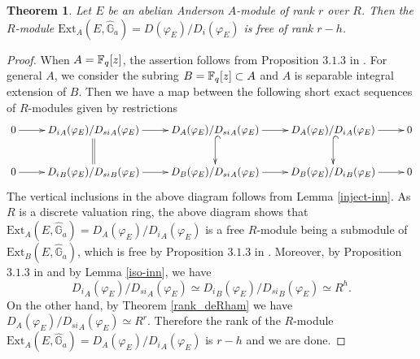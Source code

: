 \documentclass{amsart}
\newtheorem {theorem} {\bf{Theorem}}[section]
\numberwithin {equation}{section}
\begin{document}
\begin{theorem}\label{rank_Ext} Let $E$ be an abelian Anderson $A$-module of rank $r$ over $R$. Then the $R$-module $\mathrm{Ext}_{A}(E,\hat{\mathbb{G}}_{a})=D(\varphi_{E})/D_{i}(\varphi_{E})$ is free of rank $r-h$.
\end{theorem}
\begin{proof}When $A=\mathbb{F}_{q}[z]$, the assertion follows from Proposition $3.1.3$ in \cite{BrPa}. For general $A$, we consider the subring $B=\mathbb{F}_{q}[z]\subset A$ and $A$ is separable integral extension of $B$. Then we have a map between the following short exact sequences of $R$-modules given by restrictions
\begin{align*}
\xymatrix{
0  \ar[r] &{D_{i}}_{A}(\varphi_{E})/{D_{si}}_{A}(\varphi_{E}) \ar@{=}[d] \ar[r] &D_{A}(\varphi_{E})/{D_{si}}_{A}(\varphi_{E}) \ar@{^{(}->}[d] \ar[r] &D_{A}(\varphi_{E})/{D_{i}}_{A}(\varphi_{E}) \ar@{^{(}->}[d] \ar[r]&0 \\
0 \ar[r] &{D_{i}}_{B}(\varphi_{E})/{D_{si}}_{B}(\varphi_{E}) \ar[r] &D_{B}(\varphi_{E})/{D_{si}}_{A}(\varphi_{E}) \ar[r] & D_{B}(\varphi_{E})/{D_{i}}_{B}(\varphi_{E}) \ar[r] &0}
\end{align*}
The vertical inclusions in the above diagram follows from Lemma \ref{inject-inn}. As $R$ is a discrete valuation ring, the above diagram shows that $\mathrm{Ext}_{A}(E,\hat{\mathbb{G}}_{a})=D_{A}(\varphi_{E})/{D_{i}}_{A}(\varphi_{E})$ is a free $R$-module being a submodule of $\mathrm{Ext}_{B}(E,\hat{\mathbb{G}}_{a})$, which is free by Proposition $3.1.3$ in \cite{BrPa}.  
Moreover, by Proposition $3.1.3$ in \cite{BrPa} and by Lemma \ref{iso-inn}, we have $${D_{i}}_{A}(\varphi_{E})/{D_{si}}_{A}(\varphi_{E})\simeq {D_{i}}_{B}(\varphi_{E})/{D_{si}}_{B}(\varphi_{E})\simeq R^{h}.$$ On the other hand, by Theorem \ref{rank_deRham} we have $D_{A}(\varphi_{E})/{D_{si}}_{A}(\varphi_{E})\simeq R^{r}$. Therefore the rank of the $R$-module $\mathrm{Ext}_{A}(E,\hat{\mathbb{G}}_{a})=D_{A}(\varphi_{E})/{D_{i}}_{A}(\varphi_{E})$ is $r-h$ and we are done.
\end{proof}
\end{document}
